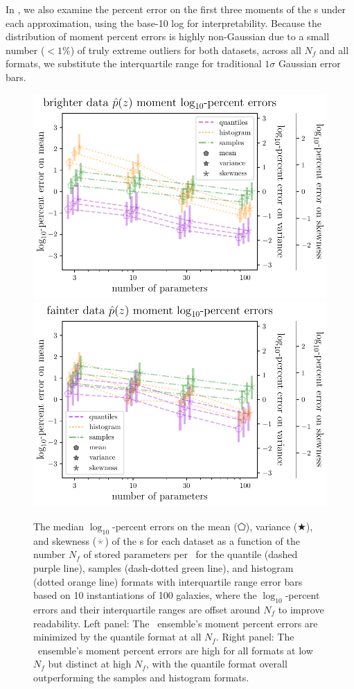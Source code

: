In , we also examine the percent error on the 
first three moments of the \pz s under each approximation, using the base-10 
log for interpretability.
Because the distribution of moment percent errors is highly non-Gaussian due to 
a small number ($<1\%$) of truly extreme outliers for both datasets, across all 
$N_{f}$ and all formats, we substitute the interquartile range for traditional 
$1\sigma$ Gaussian error bars.
\begin{figure}
	\begin{center}
		\includegraphics[width=0.5\columnwidth]{figures/qp/graham_pz_err.pdf}
		\includegraphics[width=0.5\columnwidth]{figures/qp/schmidt_pz_err.pdf}
		\caption{
			The median $\log_{10}$-percent errors on the mean ($\pentagon$), variance 
			($\bigstar$), and skewness ($\APLstar$) of the \pz s for each dataset as a 
			function of the number $N_{f}$ of stored parameters per \pz\ for the quantile 
			(dashed purple line), samples (dash-dotted green line), and histogram (dotted 
			orange line) formats with interquartile range error bars based on 10 
			instantiations of 100 galaxies, where the $\log_{10}$-percent errors and their 
			interquartile ranges are offset around $N_{f}$ to improve readability.
			Left panel: The \mgdata \pz\ ensemble's moment percent errors are minimized 
			by the quantile format at all $N_{f}$.
			Right panel: The \ssdata \pz\ ensemble's moment percent errors are high for 
			all formats at low $N_{f}$ but distinct at high $N_{f}$, with the quantile 
			format overall outperforming the samples and histogram formats.
			}
	\end{center}
\end{figure}

